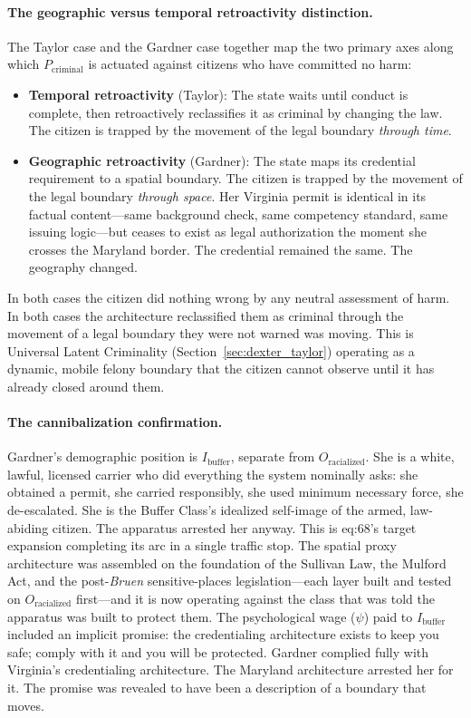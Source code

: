 \paragraph{The geographic versus temporal retroactivity distinction.}
The Taylor case and the Gardner case together map the two primary axes along which $P_{\text{criminal}}$ is actuated against citizens who have committed no harm:

\begin{itemize}
    \item \textbf{Temporal retroactivity} (Taylor): The state waits until conduct is complete, then retroactively reclassifies it as criminal by changing the law. The citizen is trapped by the movement of the legal boundary \textit{through time}.
    \item \textbf{Geographic retroactivity} (Gardner): The state maps its credential requirement to a spatial boundary. The citizen is trapped by the movement of the legal boundary \textit{through space}. Her Virginia permit is identical in its factual content---same background check, same competency standard, same issuing logic---but ceases to exist as legal authorization the moment she crosses the Maryland border. The credential remained the same. The geography changed.
\end{itemize}

In both cases the citizen did nothing wrong by any neutral assessment of harm. In both cases the architecture reclassified them as criminal through the movement of a legal boundary they were not warned was moving. This is Universal Latent Criminality (Section~\ref{sec:dexter_taylor}) operating as a dynamic, mobile felony boundary that the citizen cannot observe until it has already closed around them.

\paragraph{The cannibalization confirmation.}
Gardner's demographic position is $I_{\text{buffer}}$, separate from $O_{\text{racialized}}$. She is a white, lawful, licensed carrier who did everything the system nominally asks: she obtained a permit, she carried responsibly, she used minimum necessary force, she de-escalated. She is the Buffer Class's idealized self-image of the armed, law-abiding citizen. The apparatus arrested her anyway. This is eq:68's target expansion completing its arc in a single traffic stop. The spatial proxy architecture was assembled on the foundation of the Sullivan Law, the Mulford Act, and the post-\textit{Bruen} sensitive-places legislation---each layer built and tested on $O_{\text{racialized}}$ first---and it is now operating against the class that was told the apparatus was built to protect them. The psychological wage ($\psi$) paid to $I_{\text{buffer}}$ included an implicit promise: the credentialing architecture exists to keep you safe; comply with it and you will be protected. Gardner complied fully with Virginia's credentialing architecture. The Maryland architecture arrested her for it. The promise was revealed to have been a description of a boundary that moves.

